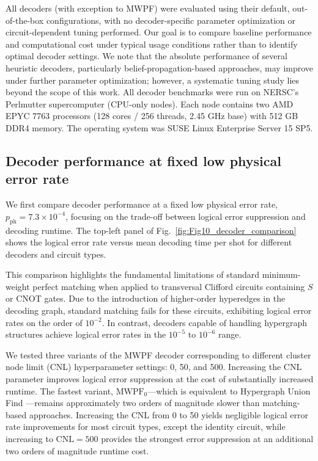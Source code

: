 \documentclass[aps, prx, reprint, superscriptaddress, longbibliography, floatfix]{revtex4-2}
\begin{document}
All decoders (with exception to MWPF) were evaluated using their default, out-of-the-box configurations, with no decoder-specific parameter optimization or circuit-dependent tuning performed. Our goal is to compare baseline performance and computational cost under typical usage conditions rather than to identify optimal decoder settings. We note that the absolute performance of several heuristic decoders, particularly belief-propagation-based approaches, may improve under further parameter optimization; however, a systematic tuning study lies beyond the scope of this work. All decoder benchmarks were run on NERSC's Perlmutter supercomputer (CPU-only nodes). Each node contains two AMD EPYC 7763 processors (128 cores / 256 threads, 2.45 GHz base) with 512 GB DDR4 memory. The operating system was SUSE Linux Enterprise Server 15 SP5.

\subsection{Decoder performance at fixed low physical error rate}
We first compare decoder performance at a fixed low physical error rate, $p_{\mathrm{ph}} = 7.3 \times 10^{-4}$, focusing on the trade-off between logical error suppression and decoding runtime. The top-left panel of Fig.~\ref{fig:Fig10_decoder_comparison} shows the logical error rate versus mean decoding time per shot for different decoders and circuit types.

This comparison highlights the fundamental limitations of standard minimum-weight perfect matching when applied to transversal Clifford circuits containing $S$ or CNOT gates. Due to the introduction of higher-order hyperedges in the decoding graph, standard matching fails for these circuits, exhibiting logical error rates on the order of $10^{-2}$. In contrast, decoders capable of handling hypergraph structures achieve logical error rates in the $10^{-5}$ to $10^{-6}$ range.

We tested three variants of the MWPF decoder corresponding to different cluster node limit (CNL) hyperparameter settings: 0, 50, and 500. Increasing the CNL parameter improves logical error suppression at the cost of substantially increased runtime. The fastest variant, $\text{MWPF}_0$—which is equivalent to Hypergraph Union Find \cite{wu2025mwpf}—remains approximately two orders of magnitude slower than matching-based approaches. Increasing the CNL from 0 to 50 yields negligible logical error rate improvements for most circuit types, except the identity circuit, while increasing to $\text{CNL}=500$ provides the strongest error suppression at an additional two orders of magnitude runtime cost.
\end{document}
